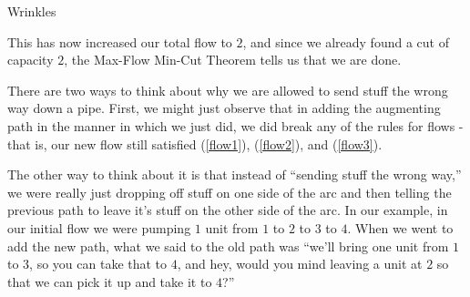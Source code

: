 \begin{frame}[fragile]{Wrinkles}

This has now increased our total flow to $2$, and since we already found a cut of capacity $2$, the Max-Flow Min-Cut Theorem tells us that we are done.

There are two ways to think about why we are allowed to send stuff the wrong way down a pipe.  First, we might just observe that in adding the augmenting path in the manner in which we just did, we did break any of the rules for flows - that is, our new flow still satisfied (\ref{flow1}), (\ref{flow2}), and (\ref{flow3}).

The other way to think about it is that instead of ``sending stuff the wrong way,'' we were really just dropping off stuff on one side of the arc and then telling the previous path to leave it's stuff on the other side of the arc.  In our example, in our initial flow we were pumping $1$ unit from $1$ to $2$ to $3$ to $4$.  When we went to add the new path, what we said to the old path was ``we'll bring one unit from $1$ to $3$, so you can take that to $4$, and hey, would you mind leaving a unit at $2$ so that we can pick it up and take it to $4$?''

\end{frame}



%
%
%
%
% 

